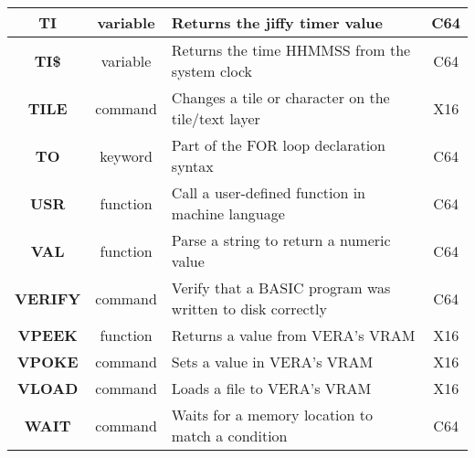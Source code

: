 \begin{longtable}{|c|c|m{4cm}|c|}
	{\bfseries TI} & variable & Returns the jiffy timer value & C64 \\ \hline
	{\bfseries TI\$} & variable & Returns the time HHMMSS from the system clock & C64 \\ \hline
	{\bfseries TILE} & command & Changes a tile or character on the tile/text layer & X16 \\ \hline
	{\bfseries TO} & keyword & Part of the {\ttfamily FOR} loop declaration syntax & C64 \\ \hline
	{\bfseries USR} & function & Call a user-defined function in machine language & C64 \\ \hline
	{\bfseries VAL} & function & Parse a string to return a numeric value & C64 \\ \hline
	{\bfseries VERIFY} & command & Verify that a BASIC program was written to disk correctly & C64 \\ \hline
	{\bfseries VPEEK} & function & Returns a value from VERA's VRAM & X16 \\ \hline
	{\bfseries VPOKE} & command & Sets a value in VERA's VRAM & X16 \\ \hline
	{\bfseries VLOAD} & command & Loads a file to VERA's VRAM & X16 \\ \hline
	{\bfseries WAIT} & command & Waits for a memory location to match a condition & C64 \\ \hline
\end{longtable}

